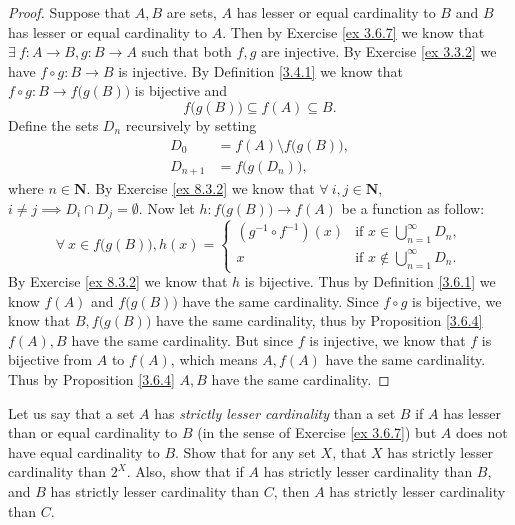 \begin{proof}
    Suppose that \(A, B\) are sets, \(A\) has lesser or equal cardinality to \(B\) and \(B\) has lesser or equal cardinality to \(A\).
    Then by Exercise \ref{ex 3.6.7} we know that \(\exists\ f : A \to B, g : B \to A\) such that both \(f, g\) are injective.
    By Exercise \ref{ex 3.3.2} we have \(f \circ g : B \to B\) is injective.
    By Definition \ref{3.4.1} we know that \(f \circ g : B \to f\big(g(B)\big)\) is bijective and
    \[
        f\big(g(B)\big) \subseteq f(A) \subseteq B.
    \]
    Define the sets \(D_n\) recursively by setting
    \begin{align*}
        D_0       & = f(A) \setminus f\big(g(B)\big), \\
        D_{n + 1} & = f\big(g(D_n)\big),
    \end{align*}
    where \(n \in \mathbf{N}\).
    By Exercise \ref{ex 8.3.2} we know that \(\forall\ i, j \in \mathbf{N}\), \(i \neq j \implies D_i \cap D_j = \emptyset\).
    Now let \(h : f\big(g(B)\big) \to f(A)\) be a function as follow:
    \[
        \forall\ x \in f\big(g(B)\big), h(x) = \begin{cases}
            (g^{-1} \circ f^{-1})(x) & \text{if } x \in \bigcup_{n = 1}^\infty D_n,    \\
            x                        & \text{if } x \notin \bigcup_{n = 1}^\infty D_n.
        \end{cases}
    \]
    By Exercise \ref{ex 8.3.2} we know that \(h\) is bijective.
    Thus by Definition \ref{3.6.1} we know \(f(A)\) and \(f\big(g(B)\big)\) have the same cardinality.
    Since \(f \circ g\) is bijective, we know that \(B, f\big(g(B)\big)\) have the same cardinality, thus by Proposition \ref{3.6.4} \(f(A), B\) have the same cardinality.
    But since \(f\) is injective, we know that \(f\) is bijective from \(A\) to \(f(A)\), which means \(A, f(A)\) have the same cardinality.
    Thus by Proposition \ref{3.6.4} \(A, B\) have the same cardinality.
\end{proof}

\begin{exercise}\label{ex 8.3.4}
    Let us say that a set \(A\) has \emph{strictly lesser cardinality} than a set \(B\) if \(A\) has lesser than or equal cardinality to \(B\) (in the sense of Exercise \ref{ex 3.6.7}) but \(A\) does not have equal cardinality to \(B\).
    Show that for any set \(X\), that \(X\) has strictly lesser cardinality than \(2^X\).
    Also, show that if \(A\) has strictly lesser cardinality than \(B\), and \(B\) has strictly lesser cardinality than \(C\), then \(A\) has strictly lesser cardinality than \(C\).
\end{exercise}

